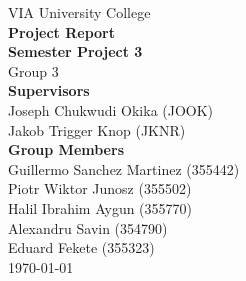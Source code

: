 \thispagestyle{empty}
\vspace*{0.15\textheight}
\begin{center}
    {\Large VIA University College}\\[2em]
    {\huge \textbf{Project Report}}\\[0.5em]
    {\Large \textbf{Semester Project 3}}\\[0.5em]
    {\Large Group 3}\\[3em]
    {\large \textbf{Supervisors}}\\[0.5em]
    {\large Joseph Chukwudi Okika (JOOK)}\\[0.5em]
    {\large Jakob Trigger Knop (JKNR)}\\[2em]
    {\large \textbf{Group Members}}\\[0.5em]
    {\large Guillermo Sanchez Martinez (355442)}\\[0.5em]
    {\large Piotr Wiktor Junosz (355502)}\\[0.5em]
    {\large Halil Ibrahim Aygun (355770)}\\[0.5em]
    {\large Alexandru Savin (354790)}\\[0.5em]
    {\large Eduard Fekete (355323)}\\[2em]
    {\large \today}
\end{center}
\vfill
\clearpage